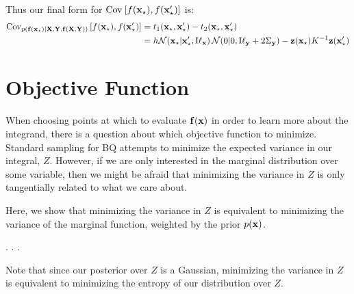 Thus our final form for $\operatorname{Cov}_{} \left[ {f({\bf{x}}_\star), f({\bf{x}}_\star')} \right]$ is:
\begin{align}
\operatorname{Cov}_{ p({\bf{f}}({\bf{x}}_\star)|\mathbf{X}, \mathbf{Y}, {\bf{f}}(\mathbf{X}, \mathbf{Y}))} \left[ {f({\bf{x}}_\star), f({\bf{x}}_\star')} \right] & = t_1({\bf{x}}_\star, {\bf{x}}_\star') - t_2({\bf{x}}_\star, {\bf{x}}_\star') \\
 & = h \mathcal{N}\!\left( {\bf{x}}_\star |{\bf{x}}_\star', {\text I} {\bf{\ell}}_{\bf{x}} \right) \mathcal{N}\!\left(0|0, {\text I} {\bf{\ell}}_{\bf{y}} + 2\Sigma_{\bf{y}}\right) - {\bf{z}}({\bf{x}}_\star) K^{-1} {\bf{z}}({\bf{x}}_\star')
\label{eq:marg_var_closed_form}
\end{align} 


\section{Objective Function}

When choosing points at which to evaluate ${\bf{f}}({\bf{x}})$ in order to learn more about the integrand, there is a question about which objective function to minimize.  Standard sampling for BQ attempts to minimize the expected variance in our integral, $Z$.  However, if we are only interested in the marginal distribution over some variable, then we might be afraid that minimizing the variance in $Z$ is only tangentially related to what we care about.

Here, we show that minimizing the variance in $Z$ is equivalent to minimizing the variance of the marginal function, weighted by the prior $p({\bf{x}})$.

.
.
.

Note that since our posterior over $Z$ is a Gaussian, minimizing the variance in $Z$ is equivalent to minimizing the entropy of our distribution over $Z$.


\outbpdocument{


}


